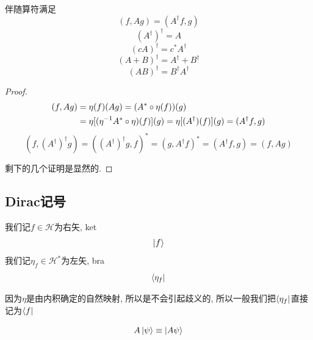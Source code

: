 \begin{theorem}[伴随算符的性质]\label{linear-adjoint}
    伴随算符满足
    \begin{equation}
        (f, Ag)=(A^\dagger f, g)\label{linear-adjoint-eq1}
    \end{equation}
    \begin{equation}
        (A^\dagger)^\dagger=A
    \end{equation}
    \begin{equation}
        (cA)^\dagger=c^*A^\dagger
    \end{equation}
    \begin{equation}
        (A+B)^\dagger=A^\dagger+B^\dagger
    \end{equation}
    \begin{equation}
        (AB)^\dagger=B^\dagger A^\dagger\label{linear-adjoint-eq2}
    \end{equation}
\end{theorem}
\begin{proof}
    \begin{align}
        (f, Ag)&=\eta(f)(Ag)=(A^*\circ\eta(f))(g)\notag\\
        &=\eta[(\eta^{-1}A^*\circ\eta)(f)](g)=\eta[(A^\dagger)(f)](g)=(A^\dagger f, g)
    \end{align}
    \begin{equation}
        (f, (A^\dagger)^\dagger g)=((A^\dagger)^\dagger g, f)^*=(g, A^\dagger f)^*=(A^\dagger f, g)=(f, Ag)
    \end{equation}

    剩下的几个证明是显然的.
\end{proof}

\subsection{Dirac记号}
\begin{definition}[左右矢]
    我们记$f\in\mathscr H$为右矢, ket
    \begin{equation}
        \ket f
    \end{equation}
    我们记$\eta_f\in\mathscr H^*$为左矢, bra
    \begin{equation}
        \bra{\eta_f}
    \end{equation}

    因为$\eta$是由内积确定的自然映射, 所以是不会引起歧义的, 所以一般我们把$\bra{\eta_f}$直接记为$\bra f$
\end{definition}

\begin{definition}[Dirac记号中的算符]
    \begin{equation}
        A\ket\psi\equiv\ket{A\psi}
    \end{equation}
\end{definition}

